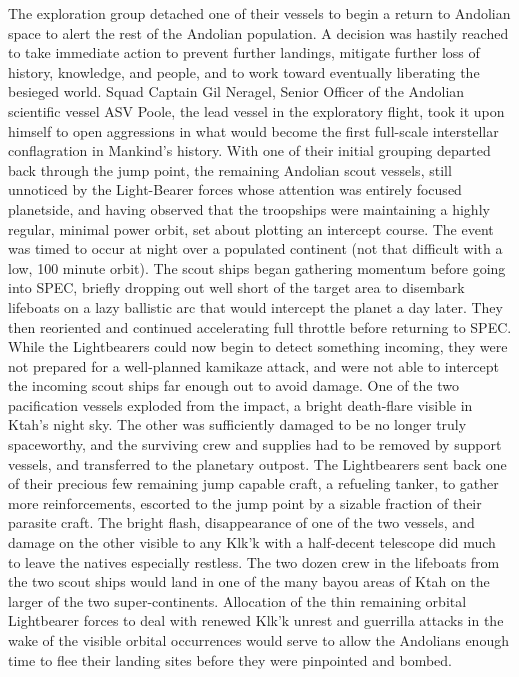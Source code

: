 \begin{itemize}
The exploration group detached one of their vessels to begin a return
to Andolian space to alert the rest of the Andolian population.  A
decision was hastily reached to take immediate action to prevent
further landings, mitigate further loss of history, knowledge, and
people, and to work toward eventually liberating the besieged world.
Squad Captain Gil Neragel, Senior Officer of the Andolian scientific
vessel ASV Poole, the lead vessel in the exploratory flight, took it
upon himself to open aggressions in what would become the first
full-scale interstellar conflagration in Mankind's history.  With one
of their initial grouping departed back through the jump point, the
remaining Andolian scout vessels, still unnoticed by the Light-Bearer
forces whose attention was entirely focused planetside, and having
observed that the troopships were maintaining a highly regular,
minimal power orbit, set about plotting an intercept course. The event
was timed to occur at night over a populated continent (not that
difficult with a low, 100 minute orbit). The scout ships began
gathering momentum before going into SPEC, briefly dropping out well
short of the target area to disembark lifeboats on a lazy ballistic
arc that would intercept the planet a day later. They then reoriented
and continued accelerating full throttle before returning to
SPEC. While the Lightbearers could now begin to detect something
incoming, they were not prepared for a well-planned kamikaze attack,
and were not able to intercept the incoming scout ships far enough out
to avoid damage. One of the two pacification vessels exploded from the
impact, a bright death-flare visible in Ktah's night sky. The other
was sufficiently damaged to be no longer truly spaceworthy, and the
surviving crew and supplies had to be removed by support vessels, and
transferred to the planetary outpost. The Lightbearers sent back one
of their precious few remaining jump capable craft, a refueling
tanker, to gather more reinforcements, escorted to the jump point by a
sizable fraction of their parasite craft. The bright flash,
disappearance of one of the two vessels, and damage on the other
visible to any Klk'k with a half-decent telescope did much to leave
the natives especially restless. The two dozen crew in the lifeboats
from the two scout ships would land in one of the many bayou areas of
Ktah on the larger of the two super-continents. Allocation of the thin
remaining orbital Lightbearer forces to deal with renewed Klk'k unrest
and guerrilla attacks in the wake of the visible orbital occurrences
would serve to allow the Andolians enough time to flee their landing
sites before they were pinpointed and bombed.


\end{itemize}
